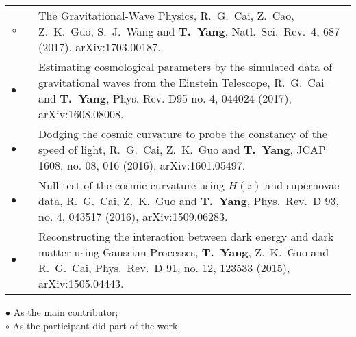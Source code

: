 \documentclass[letterpaper]{moderncv}
\begin{document}
{\begin{longtable}{rp{0.3cm}p{15.55cm}}
\textbf{$\circ$} & &  The Gravitational-Wave Physics,
  R.~G.~Cai, Z.~Cao, Z.~K.~Guo, S.~J.~Wang and \textbf{T.~Yang},
  Natl.\ Sci.\ Rev.\  {4}, 687 (2017),
  arXiv:1703.00187.
\vspace{0.05cm}\\
\textbf{$\bullet$} & & Estimating cosmological parameters by the simulated data of gravitational waves from the Einstein Telescope,
  R.~G.~Cai and \textbf{T.~Yang},
  Phys. Rev. D95 no. 4, 044024 (2017),
  arXiv:1608.08008.
\vspace{0.05cm}\\
\textbf{$\bullet$} & &  Dodging the cosmic curvature to probe the constancy of the speed of light,
  R.~G.~Cai, Z.~K.~Guo and \textbf{T.~Yang},
  JCAP {1608}, no. 08, 016 (2016),
  arXiv:1601.05497.
\vspace{0.05cm}\\
\textbf{$\bullet$} & & Null test of the cosmic curvature using $H(z)$ and supernovae data,
  R.~G.~Cai, Z.~K.~Guo and \textbf{T.~Yang},
  Phys.\ Rev.\ D {93}, no. 4, 043517 (2016),
  arXiv:1509.06283.
\vspace{0.05cm}\\
\textbf{$\bullet$} & & Reconstructing the interaction between dark energy and dark matter using Gaussian Processes,
  \textbf{T.~Yang}, Z.~K.~Guo and R.~G.~Cai,
  Phys.\ Rev.\ D {91}, no. 12, 123533 (2015),
  arXiv:1505.04443.
\vspace{0.05cm}\\
\end{longtable}
}

\textbf{$\bullet$} As the main contributor;\\
\textbf{$\circ$} As the participant did part of the work.



\end{document}
